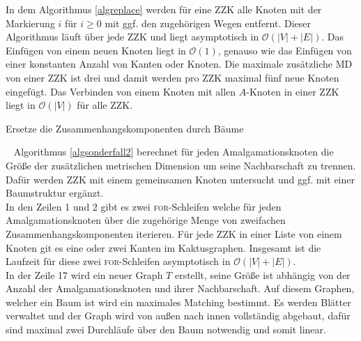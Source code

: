 In dem Algorithmus \ref{algreplace} werden für eine ZZK alle Knoten mit der Markierung $i$ für $i \geq 0$ mit ggf. den zugehörigen Wegen entfernt. Dieser Algorithmus läuft über jede ZZK und liegt asymptotisch in $\mathcal{O}(|V|+|E|)$.
Das Einfügen von einem neuen Knoten liegt in $\mathcal{O}(1)$, genauso wie das Einfügen von einer konstanten Anzahl von Kanten oder Knoten. Die maximale zusätzliche MD von einer ZZK ist drei und damit werden pro ZZK maximal fünf neue Knoten eingefügt. Das Verbinden von einem Knoten mit allen $A$-Knoten in einer ZZK liegt in $\mathcal{O}(|V|)$ für alle ZZK.\\
\vspace{-7mm}
\begin{algorithm}
\caption{Ersetze die Zusammenhangskomponenten durch Bäume}
\begin{algorithmic}[1]
\vspace{2mm}
\ENDFOR
\vspace{2mm}
\end{algorithmic}
\label{algreplace}
\end{algorithm}
\vspace{-4mm}
~\linebreak
Algorithmus \ref{algsonderfall2} berechnet für jeden Amalgamationsknoten die Größe der zusätzlichen metrischen Dimension um seine Nachbarschaft zu trennen. Dafür werden ZZK mit einem gemeinsamen Knoten untersucht und ggf. mit einer Baumstruktur ergänzt.\\ %
In den Zeilen 1 und 2 gibt es zwei \textsc{for}-Schleifen welche für jeden Amalgamationsknoten über die zugehörige Menge von zweifachen Zusammenhangskomponenten iterieren. Für jede ZZK in einer Liste von einem Knoten git es eine oder zwei Kanten im Kaktusgraphen. Insgesamt ist die Laufzeit für diese zwei \textsc{for}-Schleifen asymptotisch in $\mathcal{O}(|V|+|E|)$.\\
In der Zeile 17 wird ein neuer Graph $T$ erstellt, seine Größe ist abhängig von der Anzahl der Amalgamationsknoten und ihrer Nachbarschaft. Auf diesem Graphen, welcher ein Baum ist wird ein maximales Matching bestimmt. Es werden Blätter verwaltet und der Graph wird von außen nach innen vollständig abgebaut, dafür sind maximal zwei Durchläufe über den Baum notwendig und somit linear.\newline
